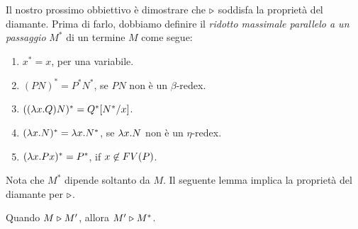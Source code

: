 \documentclass{article}
\begin{document}
Il nostro prossimo obbiettivo \`e dimostrare che $\mathrel{\triangleright}$ soddisfa la
propriet\`a del diamante. Prima di farlo, dobbiamo definire il {\em ridotto
	massimale parallelo a un passaggio} $M^*$ di un termine $M$ come segue:

\begin{enumerate}
\item $x^* = x$, per una variabile.
\item $(PN)^* = P^*N^*$, se $PN$ non \`e un $\beta$-redex. 
\item $((\lambda x.Q)N)^* = Q^*[N^*/x]$.
\item $(\lambda x.N)^* = \lambda x.N^*$, se $\lambda x.N$ non \`e un 
        $\eta$-redex.
\item $(\lambda x.Px)^* = P^*$, if $x\not\in FV(P)$.
\end{enumerate}

Nota che $M^*$ dipende soltanto da $M$. Il seguente lemma implica la
propriet\`a del diamante per $\mathrel{\triangleright}$.

\begin{lemma}
\label{lem-max-par}
  Quando $M \mathrel{\triangleright} M'$, allora $M' \mathrel{\triangleright} M^*$.
\end{lemma}
\end{document}
